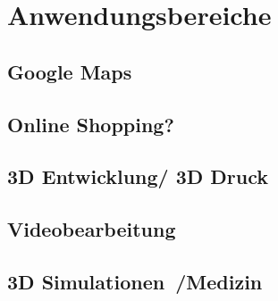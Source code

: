 \section{Anwendungsbereiche}
\subsection{Google Maps}
\subsection{Online Shopping?~\cite{WebGLExamples2}}
\subsection{3D Entwicklung/ 3D Druck}
\subsection{Videobearbeitung}
\subsection{3D Simulationen~\cite{BioDigital}/Medizin}